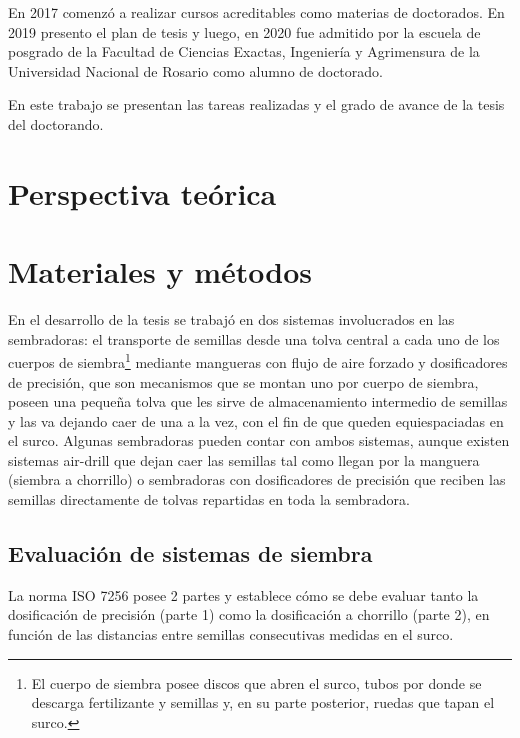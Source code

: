 \documentclass[12pt]{article}
\begin{document}
    En 2017 comenzó a realizar cursos acreditables como materias de doctorados. En 2019 presento el plan de tesis y luego, en 2020 fue admitido por la escuela de posgrado de la Facultad de Ciencias Exactas, Ingeniería y Agrimensura de la Universidad Nacional de Rosario como alumno de doctorado.
    
    En este trabajo se presentan las tareas realizadas y el grado de avance de la tesis del doctorando.
    
    \section{Perspectiva teórica}
    
    
    
    \section{Materiales y métodos}
	
    En el desarrollo de la tesis se trabajó en dos sistemas involucrados en las sembradoras: el transporte de semillas desde una tolva central a cada uno de los cuerpos de siembra\footnote{El cuerpo de siembra posee discos que abren el surco, tubos por donde se descarga fertilizante y semillas y, en su parte posterior, ruedas que tapan el surco.} mediante mangueras con flujo de aire forzado y dosificadores de precisión, que son mecanismos que se montan uno por cuerpo de siembra, poseen una pequeña tolva que les sirve de almacenamiento intermedio de semillas y las va dejando caer de una a la vez, con el fin de que queden equiespaciadas en el surco. Algunas sembradoras pueden contar con ambos sistemas, aunque existen sistemas air-drill que dejan caer las semillas tal como llegan por la manguera (siembra a chorrillo) o sembradoras con dosificadores de precisión que reciben las semillas directamente de tolvas repartidas en toda la sembradora.
    
	\subsection{Evaluación de sistemas de siembra}
	
	La norma ISO 7256 posee 2 partes y establece cómo se debe evaluar tanto la dosificación de precisión (parte 1) como la dosificación a chorrillo (parte 2), en función de las distancias entre semillas consecutivas medidas en el surco.
	
\end{document}
